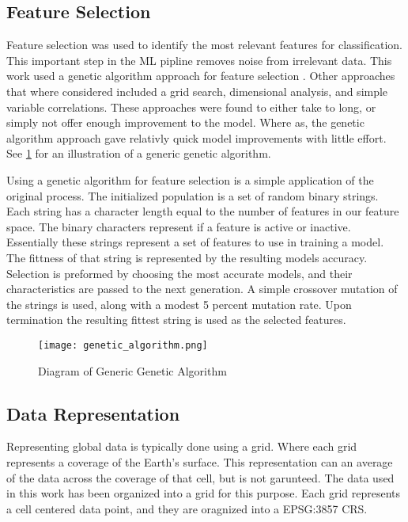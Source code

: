 \subsection{Feature Selection}
Feature selection was used to identify the most relevant features for classification.
This important step in the \ac{ML} pipline removes noise from irrelevant data.
This work used a genetic algorithm approach for feature selection \cite{yang1998feature}.
Other approaches that where considered included a grid search, dimensional analysis, and simple variable correlations.
These approaches were found to either take to long, or simply not offer enough improvement to the model.
Where as, the genetic algorithm approach gave relativly quick model improvements with little effort.
See \ref{fig:GA} for an illustration of a generic genetic algorithm.

\par
Using a genetic algorithm for feature selection is a simple application of the original process.
The initialized population is a set of random binary strings.
Each string has a character length equal to the number of features in our feature space.
The binary characters represent if a feature is active or inactive.
Essentially these strings represent a set of features to use in training a model.
The fittness of that string is represented by the resulting models accuracy.
Selection is preformed by choosing the most accurate models, and their characteristics are passed to the next generation.
A simple crossover mutation of the strings is used, along with a modest 5 percent mutation rate.
Upon termination the resulting fittest string is used as the selected features.


\begin{center}
    \begin{figure}[h]
        \caption{Diagram of Generic Genetic Algorithm}
        \label{fig:GA}
        \texttt{[image: genetic\_algorithm.png]}
    \end{figure}
\end{center}

\subsection{Data Representation}
Representing global data is typically done using a grid.
Where each grid represents a coverage of the Earth's surface.
This representation can an average of the data across the coverage of that cell, but is not garunteed.
The data used in this work has been organized into a grid for this purpose.
Each grid represents a cell centered data point, and they are oragnized into a EPSG:3857 \ac{CRS}.


